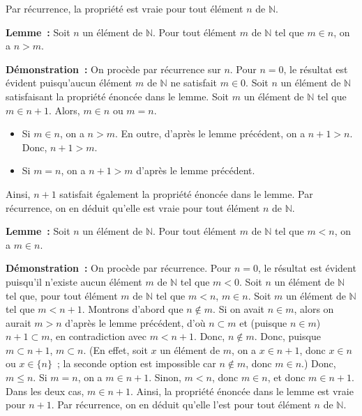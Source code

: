     Par récurrence, la propriété est vraie pour tout élément $n$ de $\mathbb{N}$.

   \done 

\medskip

\noindent\textbf{Lemme :} 
    Soit $n$ un élément de $\mathbb{N}$. 
    Pour tout élément $m$ de $\mathbb{N}$ tel que $m \in n$, on a $n > m$.

\medskip

\noindent\textbf{Démonstration :} 
    On procède par récurrence sur $n$. 
    Pour $n = 0$, le résultat est évident puisqu'aucun élément $m$ de $\mathbb{N}$ ne satisfait $m \in 0$.
    Soit $n$ un élément de $\mathbb{N}$ satisfaisant la propriété énoncée dans le lemme. 
    Soit $m$ un élément de $\mathbb{N}$ tel que $m \in n+1$. 
    Alors, $m \in n$ ou $m = n$.
    \begin{itemize}[nosep]
        \item Si $m \in n$, on a $n > m$.
            En outre, d'après le lemme précédent, on a $n+1 > n$. 
            Donc, $n+1 > m$.
        \item Si $m = n$, on a $n+1 > m$ d'après le lemme précédent.
    \end{itemize}
    Ainsi, $n+1$ satisfait également la propriété énoncée dans le lemme. 
    Par récurrence, on en déduit qu'elle est vraie pour tout élément $n$ de $\mathbb{N}$.
    
   \done 

\medskip

\noindent\textbf{Lemme :} 
    Soit $n$ un élément de $\mathbb{N}$. 
    Pour tout élément $m$ de $\mathbb{N}$ tel que $m < n$, on a $m \in n$.

\medskip

\noindent\textbf{Démonstration :} 
    On procède par récurrence. 
    Pour $n=0$, le résultat est évident puisqu'il n'existe aucun élément $m$ de $\mathbb{N}$ tel que $m < 0$.
    Soit $n$ un élément de $\mathbb{N}$ tel que, pour tout élément $m$ de $\mathbb{N}$ tel que $m < n$, $m \in n$. 
    Soit $m$ un élément de $\mathbb{N}$ tel que $m < n+1$. 
    Montrons d'abord que $n \notin m$. 
    Si on avait $n \in m$, alors on aurait $m > n$ d'après le lemme précédent, d'où $n \subset m$ et (puisque $n \in m$) $n+1 \subset m$, en contradiction avec $m < n+1$. 
    Donc, $n \notin m$. 
    Donc, puisque $m \subset n+1$, $m \subset n$. 
    (En effet, soit $x$ un élément de $m$, on a $x \in n+1$, donc $x \in n$ ou $x \in \lbrace n \rbrace$ ; la seconde option est impossible car $n \notin m$, donc $m \in n$.)
    Donc, $m \leq n$. 
    Si $m = n$, on a $m \in n+1$. 
    Sinon, $m < n$, donc $m \in n$, et donc $m \in n+1$. 
    Dans les deux cas, $m \in n+1$. 
    Ainsi, la propriété énoncée dans le lemme est vraie pour $n+1$. 
    Par récurrence, on en déduit qu'elle l'est pour tout élément $n$ de $\mathbb{N}$.

